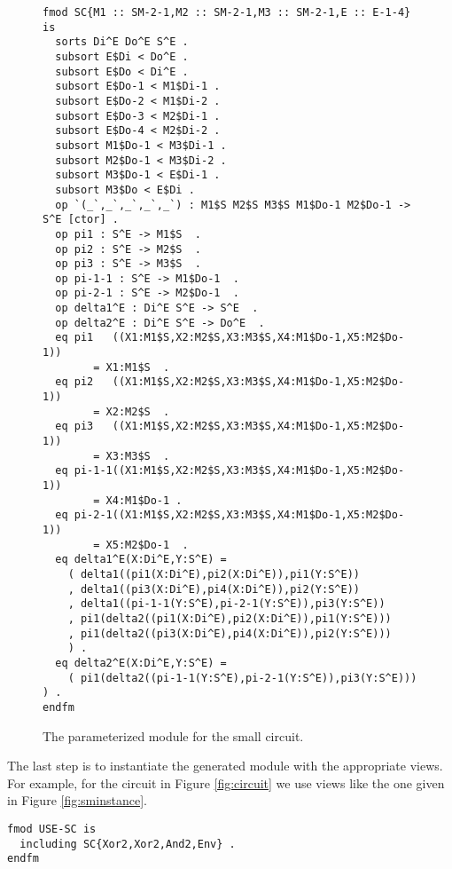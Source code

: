 \documentclass[copyright,creativecommons]{eptcs}
\begin{document}
\begin{figure}[ht]
\begin{center}
\begin{boxedminipage}{0.85\textwidth}
\begin{small}
\begin{verbatim}
fmod SC{M1 :: SM-2-1,M2 :: SM-2-1,M3 :: SM-2-1,E :: E-1-4} is
  sorts Di^E Do^E S^E .
  subsort E$Di < Do^E .
  subsort E$Do < Di^E .
  subsort E$Do-1 < M1$Di-1 .
  subsort E$Do-2 < M1$Di-2 .
  subsort E$Do-3 < M2$Di-1 .
  subsort E$Do-4 < M2$Di-2 .
  subsort M1$Do-1 < M3$Di-1 .
  subsort M2$Do-1 < M3$Di-2 .
  subsort M3$Do-1 < E$Di-1 .
  subsort M3$Do < E$Di .
  op `(_`,_`,_`,_`,_`) : M1$S M2$S M3$S M1$Do-1 M2$Do-1 -> S^E [ctor] .
  op pi1 : S^E -> M1$S  .
  op pi2 : S^E -> M2$S  .
  op pi3 : S^E -> M3$S  .
  op pi-1-1 : S^E -> M1$Do-1  .
  op pi-2-1 : S^E -> M2$Do-1  .
  op delta1^E : Di^E S^E -> S^E  .
  op delta2^E : Di^E S^E -> Do^E  .
  eq pi1   ((X1:M1$S,X2:M2$S,X3:M3$S,X4:M1$Do-1,X5:M2$Do-1)) 
        = X1:M1$S  .
  eq pi2   ((X1:M1$S,X2:M2$S,X3:M3$S,X4:M1$Do-1,X5:M2$Do-1)) 
        = X2:M2$S  .
  eq pi3   ((X1:M1$S,X2:M2$S,X3:M3$S,X4:M1$Do-1,X5:M2$Do-1)) 
        = X3:M3$S  .
  eq pi-1-1((X1:M1$S,X2:M2$S,X3:M3$S,X4:M1$Do-1,X5:M2$Do-1))
        = X4:M1$Do-1 .
  eq pi-2-1((X1:M1$S,X2:M2$S,X3:M3$S,X4:M1$Do-1,X5:M2$Do-1)) 
        = X5:M2$Do-1  .
  eq delta1^E(X:Di^E,Y:S^E) =
    ( delta1((pi1(X:Di^E),pi2(X:Di^E)),pi1(Y:S^E))
    , delta1((pi3(X:Di^E),pi4(X:Di^E)),pi2(Y:S^E))
    , delta1((pi-1-1(Y:S^E),pi-2-1(Y:S^E)),pi3(Y:S^E))
    , pi1(delta2((pi1(X:Di^E),pi2(X:Di^E)),pi1(Y:S^E)))
    , pi1(delta2((pi3(X:Di^E),pi4(X:Di^E)),pi2(Y:S^E)))
    ) .
  eq delta2^E(X:Di^E,Y:S^E) =
    ( pi1(delta2((pi-1-1(Y:S^E),pi-2-1(Y:S^E)),pi3(Y:S^E))) ) .
endfm
\end{verbatim}
\end{small}
\end{boxedminipage}
\end{center}
\caption{The parameterized module for the small circuit.}
\label{fig:module}
\end{figure}
 \afterpage{\clearpage}


The last step is to instantiate the generated module with the appropriate
views.  For example, for the circuit in Figure \ref{fig:circuit} we use views
like the one given in Figure \ref{fig:sminstance}.

\begin{center}
\begin{small}
\begin{boxedminipage}{0.50\textwidth}
\begin{verbatim}
fmod USE-SC is
  including SC{Xor2,Xor2,And2,Env} .
endfm
\end{verbatim}
\end{boxedminipage}
\end{small}
\end{center}
\end{document}

